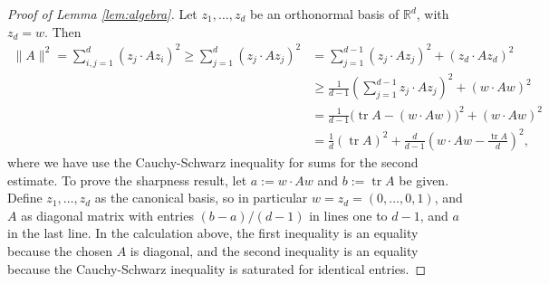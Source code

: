 \documentclass[reqno]{amsart}
\newcommand{\tr}{\operatorname{tr}}
\newcommand{\R}{\mathbb{R}}
\begin{document}
\begin{proof}[Proof of Lemma \ref{lem:algebra}]
    Let $z_1,\ldots,z_d$ be an orthonormal basis of $\R^d$, with $z_d=w$. Then
    \begin{align*}
        \|A\|^2 
        = \sum_{i,j=1}^d (z_j\cdot Az_i)^2 
        \ge \sum_{j=1}^d (z_j\cdot Az_j)^2 
        &= \sum_{j=1}^{d-1} (z_j\cdot Az_j)^2 + (z_d\cdot Az_d)^2 \\
        &\ge \frac1{d-1}\left(\sum_{j=1}^{d-1} z_j\cdot Az_j\right)^2 + (w\cdot Aw)^2 \\
        &= \frac1{d-1}\big(\tr A-(w\cdot Aw)\big)^2 + (w\cdot Aw)^2 \\
        &= \frac1d(\tr A)^2 + \frac{d}{d-1}\left(w\cdot Aw - \frac{\tr A}d\right)^2,
    \end{align*}
    where we have use the Cauchy-Schwarz inequality for sums for the second estimate. To prove the sharpness result, let $a:=w\cdot Aw$ and $b:=\tr A$ be given. Define $z_1,\ldots,z_d$ as the canonical basis, so in particular $w=z_d=(0,\ldots,0,1)$, and $A$ as diagonal matrix with entries $(b-a)/(d-1)$ in lines one to $d-1$, and $a$ in the last line. In the calculation above, the first inequality is an equality because the chosen $A$ is diagonal, and the second inequality is an equality because the Cauchy-Schwarz inequality is saturated for identical entries.
\end{proof}
%
\end{document}
